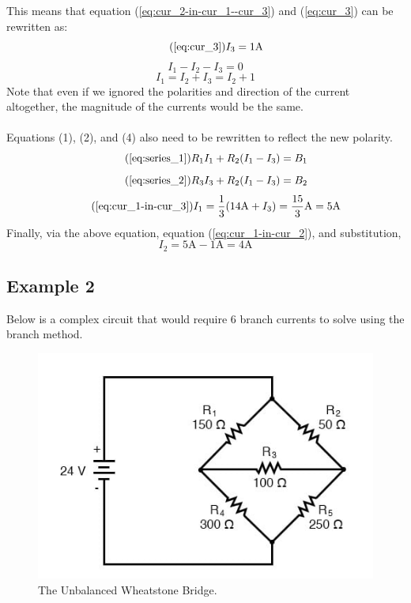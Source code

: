 \documentclass{article}
\begin{document}
	This means that equation (\ref{eq:cur_2-in-cur_1--cur_3})  and 
	(\ref{eq:cur_3}) can be rewritten as:
	\begin{equation}\tag{\ref{eq:cur_3}}
		I_3 = 1\text{A}
	\end{equation}
	$$ I_1-I_2-I_3 =0$$
	\begin{equation}\label{eq:cur_1-in-cur_2}
		I_1 = I_2 + I_3 = I_2 + 1
	\end{equation}
	Note that even if we ignored the polarities and direction of the current 
	altogether, the magnitude of the currents would be the same. \\ \\
	Equations (1), (2), and (4) also need to be rewritten to reflect the new 
	polarity.
	\begin{equation}\tag{\ref{eq:series_1}}
		R_1I_1 + R_2(I_1-I_3) = B_1
	\end{equation}
	\begin{equation}\tag{\ref{eq:series_2}}
		R_3I_3 + R_2(I_1 - I_3) = B_2
	\end{equation}
	\begin{equation}\tag{\ref{eq:cur_1-in-cur_3}}
		I_1 = \frac{1}{3}(14\text{A} + I_3) = \frac{15}{3}\text{A} = 5\text{A}
	\end{equation}
	Finally, via the above equation, equation (\ref{eq:cur_1-in-cur_2}), and 
	substitution,
	$$ I_2 = 5\text{A}-1\text{A}=4\text{A}$$
	\subsection{Example 2}
	Below is a complex circuit that would require 6 branch currents to solve 
	using the branch method.
	\begin{figure}[H]\label{fig:circuit-3}		
		\caption{The Unbalanced Wheatstone Bridge.}
		\centering
		\includegraphics[width=0.75\linewidth,height=0.5\linewidth]{circuit-3}
	\end{figure}
\end{document}
